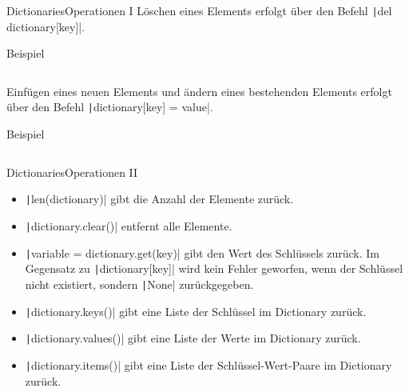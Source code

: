 \documentclass[xelatex,aspectratio=169]{beamer}
\begin{document}
\begin{frame}{Dictionaries}{Operationen I}
    Löschen eines Elements erfolgt über den Befehl \texttt|del dictionary[key]|.
    \begin{exampleblock}{Beispiel}
        \inputminted[firstline=14,lastline=14]{python}{src/dictionaries_overview.py}
    \end{exampleblock}

    Einfügen eines neuen Elements und ändern eines bestehenden Elements erfolgt über den Befehl \texttt|dictionary[key] = value|.

    \begin{exampleblock}{Beispiel}
        \inputminted[firstline=16,lastline=17]{python}{src/dictionaries_overview.py}
    \end{exampleblock}

\end{frame}
\begin{frame}{Dictionaries}{Operationen II}
    \begin{itemize}
        \item \texttt|len(dictionary)| gibt die Anzahl der Elemente zurück.
        \item \texttt|dictionary.clear()| entfernt alle Elemente.
        \item \texttt|variable = dictionary.get(key)| gibt den Wert des Schlüssels zurück. Im Gegensatz zu \texttt|dictionary[key]| wird kein Fehler geworfen, wenn der Schlüssel nicht existiert, sondern \texttt|None| zurückgegeben.
        \item \texttt|dictionary.keys()| gibt eine Liste der Schlüssel im Dictionary zurück.
        \item \texttt|dictionary.values()| gibt eine Liste der Werte im Dictionary zurück.
        \item \texttt|dictionary.items()| gibt eine Liste der Schlüssel-Wert-Paare im Dictionary zurück.
    \end{itemize}

\end{frame}
\end{document}
